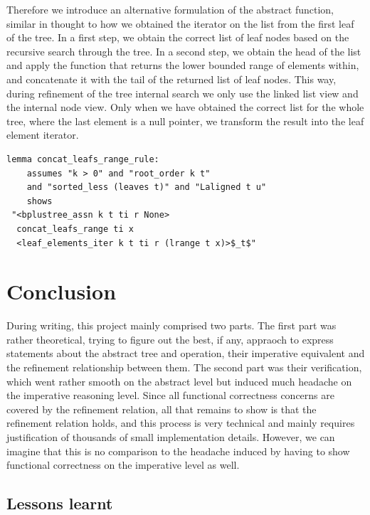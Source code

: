 \documentclass[a4paper,UKenglish,cleveref, autoref, thm-restate]{lipics-v2021}
\begin{document}
Therefore we introduce an alternative formulation of the
abstract function, similar in thought to how we obtained the iterator
on the list from the first leaf of the tree.
In a first step, we obtain the correct list of leaf nodes
based on the recursive search through the tree.
In a second step, we obtain the head of the list and apply
the function that returns the lower bounded range of elements within,
and concatenate it with the tail of the returned list of leaf nodes.
This way, during refinement of the tree internal search
we only use the linked list view and the internal node view.
Only when we have obtained the correct list for the whole tree,
where the last element is a null pointer,
we transform the result into the leaf element iterator.

\begin{lstlisting}[mathescape=true, language=Isabelle,label=lst:btree-leafs-range]
lemma concat_leafs_range_rule:
    assumes "k > 0" and "root_order k t" 
    and "sorted_less (leaves t)" and "Laligned t u"
    shows 
 "<bplustree_assn k t ti r None>
  concat_leafs_range ti x
  <leaf_elements_iter k t ti r (lrange t x)>$_t$"
\end{lstlisting}



\section{Conclusion}
\label{sec:conclusion}

During writing, this project mainly comprised two parts.
The first part was rather theoretical,
trying to figure out the best, if any, appraoch
to express statements about the abstract tree and operation,
their imperative equivalent and
the refinement relationship between them.
The second part was their verification,
which went rather smooth on the abstract level but induced much headache
on the imperative reasoning level.
Since all functional correctness concerns are covered by
the refinement relation, all that remains
to show is that the refinement relation holds,
and this process is very technical
and mainly requires justification of thousands of small
implementation details.
However, we can imagine that this is no comparison
to the headache induced by having to show
functional correctness on the imperative level as well.

\subsection{Lessons learnt}
\end{document}
